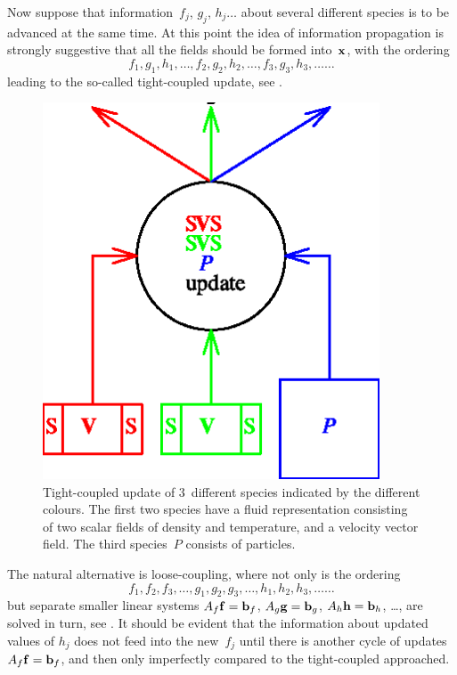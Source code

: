 Now suppose that information~$f_j$, $g_j$, $h_j \ldots$ about several different
species is to be advanced at the same time. At this point the idea of information
propagation is strongly suggestive that all the fields should be formed into~${\bf x}$,
with the ordering
\begin{equation} \label{eq:close}
f_1,g_1,h_1,\ldots, f_2,g_2,h_2,\ldots,f_3,g_3,h_3,\ldots\ldots
\end{equation}
leading to the so-called tight-coupled update, see .
\begin{figure}
\centerline{\includegraphics[width=10cm]{../pics/fvpups}}
\caption{Tight-coupled update of $3$~different species indicated by the different colours.
The first two species have a fluid representation consisting of two scalar fields
of density and temperature, and a velocity vector field. The third species~$P$
consists of particles. 
\label{fig:tight}}
\end{figure}

The natural alternative is loose-coupling, where not only is the ordering
\begin{equation} \label{eq:loose}
f_1,f_2,f_3,\ldots, g_1,g_2,g_3,\ldots,h_1,h_2,h_3,\ldots\ldots
\end{equation}
but separate smaller linear systems $A_f {\bf f}= {\bf b}_f$, 
$A_g {\bf g}= {\bf b}_g$, $A_h {\bf h}= {\bf b}_h$, \ldots, are solved in turn,
see . It should be evident that the information about updated values
of $h_j$ does not feed into the  new~$f_j$ until there is another cycle 
of updates $A_f {\bf f}= {\bf b}_f$, and then only imperfectly
compared to the tight-coupled approached.


